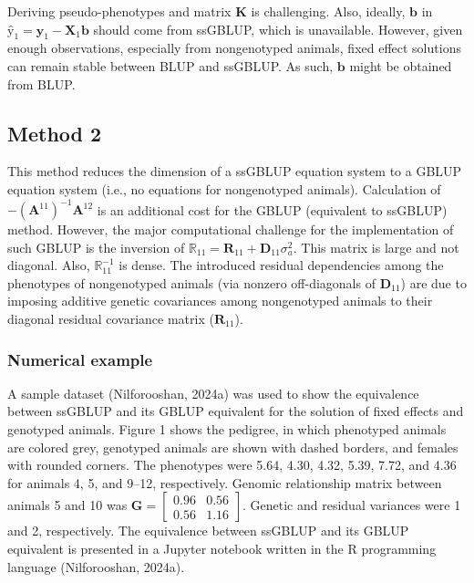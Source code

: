 \documentclass[authordate, empirical]{jote-new-article}
\begin{document}
	Deriving pseudo-phenotypes and matrix $\textbf{K}$ is challenging. Also, ideally, $\textbf{\^{b}}$ in $\textbf{\^{y}}_1=\textbf{y}_1-\textbf{X}_1 \textbf{\^{b}}$ should come from ssGBLUP, which is unavailable. However, given enough observations, especially from nongenotyped animals, fixed effect solutions can remain stable between BLUP and ssGBLUP. As such, $\textbf{\^{b}}$ might be obtained from BLUP.



	\subsection{Method 2}



	This method reduces the dimension of a ssGBLUP equation system to a GBLUP equation system (i.e., no equations for nongenotyped animals). Calculation of $-(\textbf{A}^{11} )^{-1} \textbf{A}^{12}$ is an additional cost for the GBLUP (equivalent to ssGBLUP) method. However, the major computational challenge for the implementation of such GBLUP is the inversion of $\mathbb{R}_{11}=\textbf{R}_{11}+\textbf{D}_{11} \sigma_a^2$. This matrix is large and not diagonal. Also, $\mathbb{R}_{11}^{-1}$ is dense. The introduced residual dependencies among the phenotypes of nongenotyped animals (via nonzero off-diagonals of $\textbf{D}_{11}$) are due to imposing additive genetic covariances among nongenotyped animals to their diagonal residual covariance matrix ($\textbf{R}_{11}$).



	\subsubsection{Numerical example}



	A sample dataset (Nilforooshan, 2024a) was used to show the equivalence between ssGBLUP and its GBLUP equivalent for the solution of fixed effects and genotyped animals. Figure 1 shows the pedigree, in which phenotyped animals are colored grey, genotyped animals are shown with dashed borders, and females with rounded corners. The phenotypes were 5.64, 4.30, 4.32, 5.39, 7.72, and 4.36 for animals 4, 5, and 9--12, respectively. Genomic relationship matrix between animals 5 and 10 was $\textbf{G}=\begin{bmatrix}0.96&0.56\\0.56&1.16\end{bmatrix}$. Genetic and residual variances were 1 and 2, respectively. The equivalence between ssGBLUP and its GBLUP equivalent is presented in a Jupyter notebook written in the R programming language (Nilforooshan, 2024a).
\end{document}
